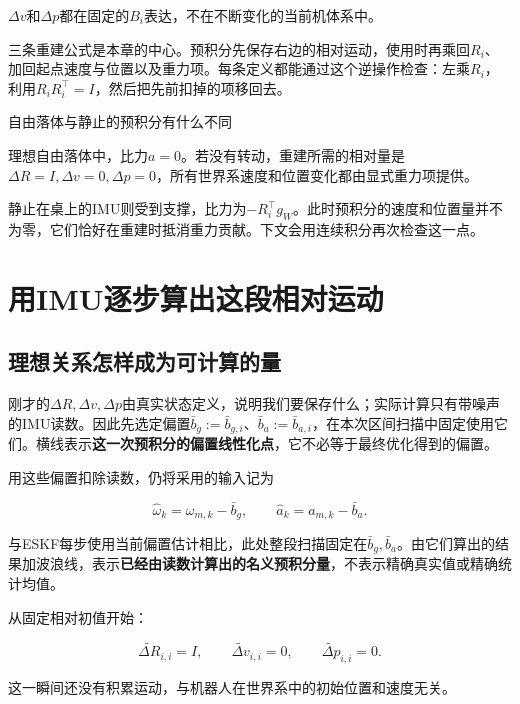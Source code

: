 $\Delta v$和$\Delta p$都在固定的$B_i$表达，不在不断变化的当前机体系中。

三条重建公式是本章的中心。预积分先保存右边的相对运动，使用时再乘回$R_i$、加回起点速度与位置以及重力项。每条定义都能通过这个逆操作检查：左乘$R_i$，利用$R_iR_i^\top=I$，然后把先前扣掉的项移回去。

\begin{bookexample}{自由落体与静止的预积分有什么不同}

理想自由落体中，比力$a=0$。若没有转动，重建所需的相对量是$\Delta R=I,\Delta v=0,\Delta p=0$，所有世界系速度和位置变化都由显式重力项提供。

静止在桌上的IMU则受到支撑，比力为$-R_i^\top g_W$。此时预积分的速度和位置量并不为零，它们恰好在重建时抵消重力贡献。下文会用连续积分再次检查这一点。

\end{bookexample}

\section{用IMU逐步算出这段相对运动}

\subsection{理想关系怎样成为可计算的量}

刚才的$\Delta R,\Delta v,\Delta p$由真实状态定义，说明我们要保存什么；实际计算只有带噪声的IMU读数。因此先选定偏置$\bar b_g:=\bar b_{g,i}$、$\bar b_a:=\bar b_{a,i}$，在本次区间扫描中固定使用它们。横线表示\textbf{这一次预积分的偏置线性化点}，它不必等于最终优化得到的偏置。

用这些偏置扣除读数，仍将采用的输入记为

\begin{equation*}
\hat\omega_k=\omega_{m,k}-\bar b_g,\qquad
 \hat a_k=a_{m,k}-\bar b_a.
\end{equation*}

与ESKF每步使用当前偏置估计相比，此处整段扫描固定在$\bar b_g,\bar b_a$。由它们算出的结果加波浪线，表示\textbf{已经由读数计算出的名义预积分量}，不表示精确真实值或精确统计均值。

从固定相对初值开始：

\begin{equation*}
\widetilde{\Delta R}_{i,i}=I,\qquad
 \widetilde{\Delta v}_{i,i}=0,\qquad
 \widetilde{\Delta p}_{i,i}=0.
\end{equation*}

这一瞬间还没有积累运动，与机器人在世界系中的初始位置和速度无关。

